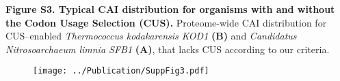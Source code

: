 \documentclass{report}
\begin{document}
{\bf Figure S3. Typical CAI distribution for organisms with and without the Codon Usage Selection (CUS).} Proteome-wide CAI distribution for CUS--enabled {\it Thermococcus kodakarensis KOD1} {\bf (B)} and {\it Candidatus Nitrosoarchaeum limnia SFB1} {\bf (A)}, that lacks CUS according to our criteria.

\begin{figure}[h!]
	\centering
	\texttt{[image: ../Publication/SuppFig3.pdf]}
\end{figure}
\end{document}

